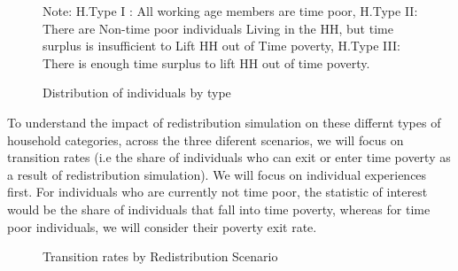 \documentclass[
  11pt,
]{article}
\begin{document}
\begin{figure}[H]
{\begin{figure}[H]
\begin{minipage}{0.50\linewidth}
{}


\end{minipage}%

\end{figure}%

\footnotesize 

\begin{flushleft}Note: H.Type I : All working age members are time poor, H.Type II: There are Non-time poor individuals Living in the HH, but time surplus is insufficient to Lift HH out of Time poverty, H.Type III: There is enough time surplus to lift HH out of time poverty.\end{flushleft}

}

\caption{\label{fig-dist}Distribution of individuals by type}

\end{figure}%

To understand the impact of redistribution simulation on these differnt
types of household categories, across the three diferent scenarios, we
will focus on transition rates (i.e the share of individuals who can
exit or enter time poverty as a result of redistribution simulation). We
will focus on individual experiences first. For individuals who are
currently not time poor, the statistic of interest would be the share of
individuals that fall into time poverty, whereas for time poor
individuals, we will consider their poverty exit rate.

\begin{figure}[H]


\caption{\label{fig-transition1}Transition rates by Redistribution
Scenario}

\end{figure}%
\end{document}
